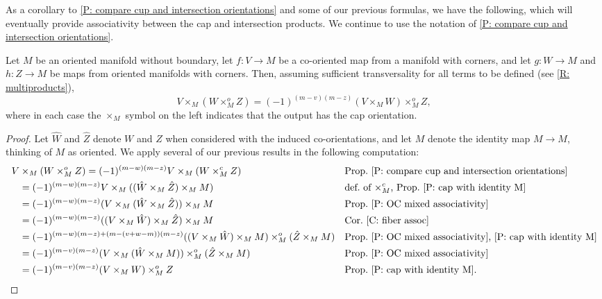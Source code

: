 As a corollary to \cref{P: compare cup and intersection orientations} and some of our previous formulas, we have the following, which will eventually provide associativity between the cap and intersection products.
We continue to use the notation of \cref{P: compare cup and intersection orientations}.

\begin{corollary}\label{C: cap/intersect}
	Let $M$ be an oriented manifold without boundary, let $f \colon V \to M$ be a co-oriented map from a manifold with corners, and let $g \colon W \to M$ and $h \colon Z \to M$ be maps from oriented manifolds with corners.
	Then, assuming sufficient transversality for all terms to be defined (see \cref{R: multiproducts}), $$V \times_M (W \times_M^o Z) = (-1)^{(m-v)(m-z)} (V \times_M W) \times_M^o Z,$$
	where in each case the $\times_M$ symbol on the left indicates that the output has the cap orientation.
\end{corollary}

\begin{proof}
	Let $\hat W$ and $\hat Z$ denote $W$ and $Z$ when considered with the induced co-orientations, and let $M$ denote the identity map $M \to M$, thinking of $M$ as oriented.
	We apply several of our previous results in the following computation:
	\[
	\begin{aligned}
		V &\times_M (W \times_M^o Z)
		= (-1)^{(m-w)(m-z)} V \times_M (W \times_M^c Z)
		&& \text{Prop.~\ref{P: compare cup and intersection orientations}} \\
		&= (-1)^{(m-w)(m-z)} V \times_M ((\hat W \times_M \hat Z)\times_M M)
		&& \text{def.\ of $\times_M^c$, Prop.~\ref{P: cap with identity M}} \\
		&= (-1)^{(m-w)(m-z)} (V \times_M (\hat W \times_M \hat Z)) \times_M M
		&& \text{Prop.~\ref{P: OC mixed associativity}} \\
		&= (-1)^{(m-w)(m-z)} ((V \times_M \hat W) \times_M \hat Z)\times_M M
		&& \text{Cor.~\ref{C: fiber assoc}} \\
		&= (-1)^{(m-w)(m-z)+(m-(v+w-m))(m-z)} ((V \times_M \hat W)\times_M M) \times_M^o (\hat Z \times_M M)
		&& \text{Prop.~\ref{P: OC mixed associativity},~\ref{P: cap with identity M}} \\
		&= (-1)^{(m-v)(m-z)} (V \times_M (\hat W\times_M M)) \times_M^o (\hat Z \times_M M)
		&& \text{Prop.~\ref{P: OC mixed associativity}} \\
		&= (-1)^{(m-v)(m-z)} (V \times_M W) \times_M^o Z
		&& \text{Prop.~\ref{P: cap with identity M}.}\qedhere
	\end{aligned}
	\]
\end{proof}

